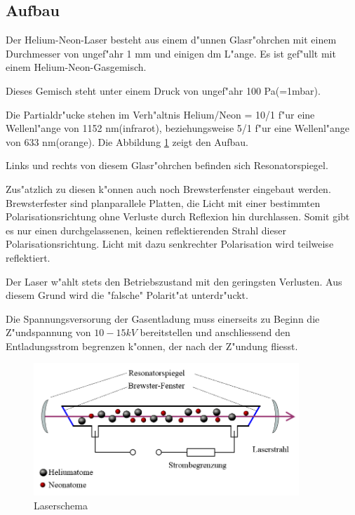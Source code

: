 \begin{refsection}
\subsection{Aufbau}
\label{He-Ne-Laser Aufbau}
Der Helium-Neon-Laser besteht aus einem d"unnen Glasr"ohrchen mit einem 
Durchmesser von ungef"ahr 1 mm und einigen dm L"ange. Es ist gef"ullt mit 
einem Helium-Neon-Gasgemisch. 

Dieses Gemisch steht unter einem Druck von ungef"ahr 100 Pa(=1mbar).

Die Partialdr"ucke stehen im Verh"altnis Helium/Neon = 10/1 f"ur eine 
Wellenl"ange von 1152 nm(infrarot),
beziehungsweise 5/1 f"ur eine Wellenl"ange von 633 nm(orange).
Die Abbildung \ref{Laserschema} zeigt den Aufbau.

Links und rechts von diesem Glasr"ohrchen befinden sich Resonatorspiegel.

Zus"atzlich zu diesen k"onnen auch noch Brewsterfenster eingebaut werden.
Brewsterfester sind planparallele Platten, die Licht mit einer bestimmten 
Polarisationsrichtung ohne Verluste durch Reflexion hin durchlassen. Somit 
gibt es nur einen durchgelassenen, keinen reflektierenden Strahl dieser 
Polarisationsrichtung. Licht mit dazu senkrechter Polarisation wird teilweise 
reflektiert.

Der Laser w"ahlt stets den Betriebszustand mit den geringsten Verlusten. Aus 
diesem Grund wird die "falsche" Polarit"at unterdr"uckt.

Die Spannungsversorung der Gasentladung muss einerseits zu Beginn die 
Z"undspannung von $10 - 15 kV$ bereitstellen und anschliessend den 
Entladungsstrom begrenzen k"onnen, der nach der Z"undung fliesst.

\begin{figure}
\centering
\includegraphics[width = 10cm]{laser/bilder/Laserschema.png}
\caption{Laserschema}
\label{Laserschema}
\end{figure}



\end{refsection}
